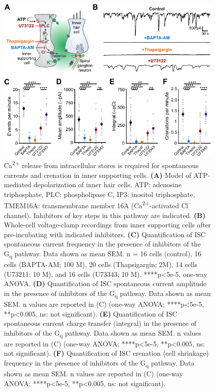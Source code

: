 \documentclass[9pt,lineno]{elife}
\begin{document}
\begin{figure}
\includegraphics[width=\linewidth]{figures/Fig1.pdf}
\caption{Ca\textsuperscript{2+} release from intracellular stores is required for spontaneous currents and crenation in inner supporting cells. 
\textbf{(A)} Model of ATP-mediated depolarization of inner hair cells. ATP: adenosine triphosphate, PLC: phospholipase C, IP3: inositol triphosphate, TMEM16A: transmembrane member 16A (Ca\textsuperscript{2+}-activated Cl\textsuperscript{--} channel). Inhibitors of key steps in this pathway are indicated. 
\textbf{(B)}	Whole-cell voltage-clamp recordings from inner supporting cells after pre-incubating with indicated inhibitors.
\textbf{(C)} Quantification of ISC spontaneous current frequency in the presence of inhibitors of the G\textsubscript{q} pathway. Data shown as mean \textpm \hspace{0.2 mm} SEM. n = 16 cells (control), 16 cells (BAPTA-AM; 100 \textmu M), 20 cells (Thapsigargin; 2\textmu M), 14 cells (U73211; 10 \textmu M), and 16 cells (U73343; 10 \textmu M). ****p<5e-5, one-way ANOVA.
\textbf{(D)} Quantification of ISC spontaneous current amplitude in the presence of inhibitors of the G\textsubscript{q} pathway. Data shown as mean \textpm \hspace{0.2 mm} SEM. n values are reported in (C) (one-way ANOVA; ****p<5e-5, **p<0.005, ns: not significant).
\textbf{(E)} Quantification of ISC spontaneous current charge transfer (integral) in the presence of inhibitors of the G\textsubscript{q} pathway. Data shown as mean \textpm \hspace{0.2 mm} SEM. n values are reported in (C) (one-way ANOVA; ****p<5e-5, **p<0.005, ns: not significant).
\textbf{(F)} Quantification of ISC crenation (cell shrinkage) frequency in the presence of inhibitors of the G\textsubscript{q} pathway. Data shown as mean \textpm SEM. n values are reported in (C) (one-way ANOVA; ****p<5e-5, **p<0.005, ns: not significant).
}
\label{fig:f1}
\end{figure}
\end{document}
